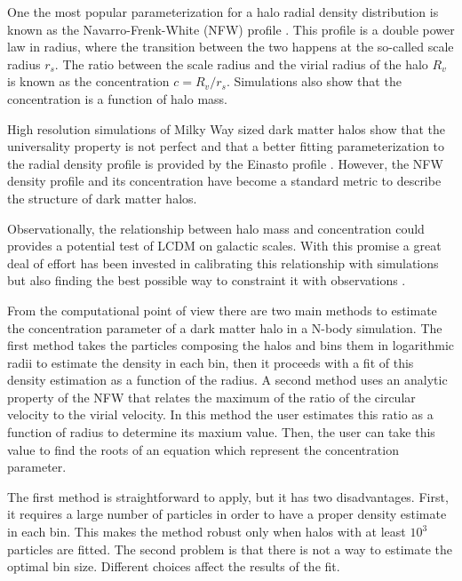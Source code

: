 \documentclass{emulateapj}
\begin{document}
One the most popular parameterization for a halo radial density
distribution is known as the Navarro-Frenk-White (NFW) profile
\citep{NFW}.
This profile is a  double power law in radius, where the transition
between the two happens at the so-called scale radius $r_s$.
The ratio between the scale radius and the virial radius of the halo
$R_v$ is known as the concentration $c=R_v/r_s$.
Simulations also show that the concentration is a function of halo
mass.


High resolution simulations of Milky Way sized dark matter halos
\citep{Navarro2010} show that the universality property is not
perfect and that a better fitting parameterization to the radial
density profile is provided by the Einasto profile
\citep{Einasto1965}.
However, the NFW density profile and its concentration have become a
standard metric to describe the structure of dark matter
halos.


Observationally, the relationship between halo mass and concentration
could provides a potential test of LCDM on galactic scales.
With this promise a great deal of effort has been
invested in calibrating this relationship with simulations
\citep{Neto2007,Duffy2008,Munoz2011,Prada2012,Ludlow2014} but also
finding the best possible way to constraint it with observations
\citep{Buote2007,Comerford2007,Mandelbaum2008,Giocoli2014,Foex2014,Shan2015}.

From the computational point of view there are two main methods to
estimate the concentration parameter of a dark matter halo in a N-body
simulation.
The first method takes the particles composing the halos
and bins them in logarithmic radii to estimate the density in each
bin, then it proceeds with a fit of this density estimation as a
function of the radius.
A second method uses an analytic property of the
NFW that relates the maximum of the ratio of the circular velocity to
the virial velocity.
In this method the user estimates this ratio as a function of radius
to determine its maxium value.
Then, the user can take this value to find the roots of an equation
which represent the concentration parameter.

The first method is straightforward to apply, but it has two
disadvantages.
First, it requires a large number of particles in
order to have a proper density estimate in each bin.
This makes the method robust only when halos with at least  $10^3$
particles are fitted.
The second problem is that there is not a way to estimate the optimal
bin size.
Different choices affect the results of the fit.
\end{document}
